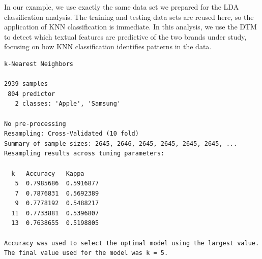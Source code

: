 In our example, we use exactly the same data set we prepared for
the LDA classification analysis. The training and testing data sets are
reused here, so the application of KNN classification is immediate. In this
analysis, we use the DTM to detect which textual features are
predictive of the two brands under study, focusing on how KNN classification identifies
patterns in the data.

\begin{Shaded}
\begin{Highlighting}[]
\OtherTok{\textless{}{-}} \NormalTok{(} \NormalTok{, } \NormalTok{, } \NormalTok{)}

\OtherTok{\textless{}{-}} \SpecialCharTok{\textasciitilde{}}  \NormalTok{, } \NormalTok{, } \NormalTok{)}

\end{Highlighting}
\end{Shaded}

\begin{verbatim}
k-Nearest Neighbors 

2939 samples
 804 predictor
   2 classes: 'Apple', 'Samsung' 

No pre-processing
Resampling: Cross-Validated (10 fold) 
Summary of sample sizes: 2645, 2646, 2645, 2645, 2645, 2645, ... 
Resampling results across tuning parameters:

  k   Accuracy   Kappa    
   5  0.7985686  0.5916877
   7  0.7876831  0.5692389
   9  0.7778192  0.5488217
  11  0.7733881  0.5396807
  13  0.7638655  0.5198805

Accuracy was used to select the optimal model using the largest value.
The final value used for the model was k = 5.
\end{verbatim}

